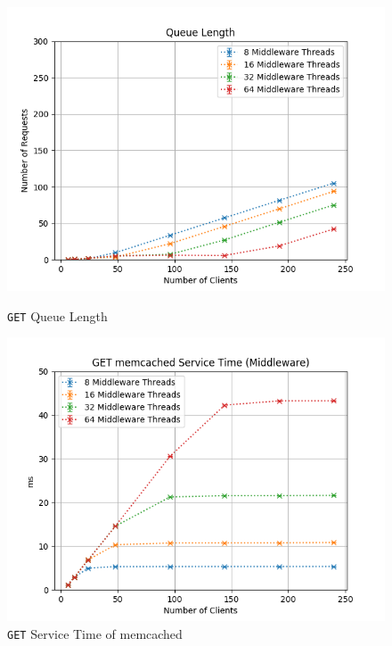 \documentclass[11pt,a4paper]{article}
\begin{document}
\begin{figure}[H]
	\centering
	\captionsetup{width=0.4\textwidth}
    \begin{minipage}{0.5\textwidth}
        \includegraphics[width=\textwidth]{../illustrations/plots/2_2_two_middlewares/0-1/middleware_queue_length.png}
        \caption{\texttt{GET} Queue Length}
        \label{fig:two_middlewares_get_ql}
    \end{minipage}\hfill
    \begin{minipage}{0.5\textwidth}
        \centering
        \includegraphics[width=\textwidth]{../illustrations/plots/2_2_two_middlewares/0-1/middleware_get_service_time_ms.png}
        \caption{\texttt{GET} Service Time of memcached}
        \label{fig:two_middlewares_get_st_mw}
    \end{minipage}
\end{figure}
\end{document}
